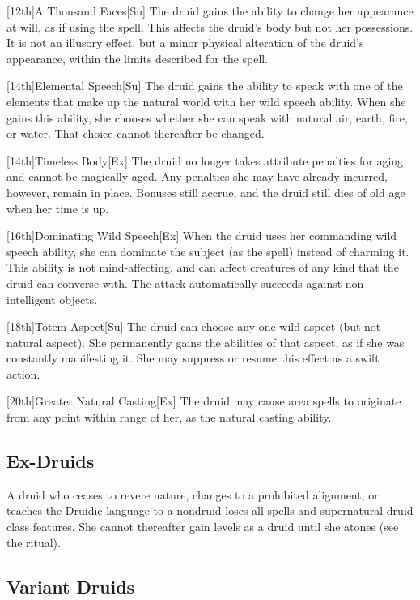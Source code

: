 [12th]{A Thousand Faces}[Su] The druid gains the ability to change her appearance at will, as if using the 
spell.
This affects the druid's body but not her possessions.
It is not an illusory effect, but a minor physical alteration of the druid's appearance, within the limits described for the spell.

[14th]{Elemental Speech}[Su]
The druid gains the ability to speak with one of the elements that make up the natural world with her wild speech ability.
When she gains this ability, she chooses whether she can speak with natural air, earth, fire, or water.
That choice cannot thereafter be changed.

[14th]{Timeless Body}[Ex]
The druid no longer takes attribute penalties for aging and cannot be magically aged.
Any penalties she may have already incurred, however, remain in place.
Bonuses still accrue, and the druid still dies of old age when her time is up.

[16th]{Dominating Wild Speech}[Ex]
When the druid uses her commanding wild speech ability, she can dominate the subject (as the 
spell) instead of charming it.
This ability is not mind-affecting, and can affect creatures of any kind that the druid can converse with.
The attack automatically succeeds against non-intelligent objects.

[18th]{Totem Aspect}[Su]
The druid can choose any one wild aspect (but not natural aspect).
She permanently gains the abilities of that aspect, as if she was constantly manifesting it.
She may suppress or resume this effect as a swift action.

[20th]{Greater Natural Casting}[Ex]
The druid may cause area spells to originate from any point within \rngmed range of her, as the natural casting ability.

\subsection{Ex-Druids}
A druid who ceases to revere nature, changes to a prohibited alignment, or teaches the Druidic language to a nondruid loses all spells and supernatural druid class features.
She cannot thereafter gain levels as a druid until she atones (see the  ritual).

\subsection{Variant Druids}

